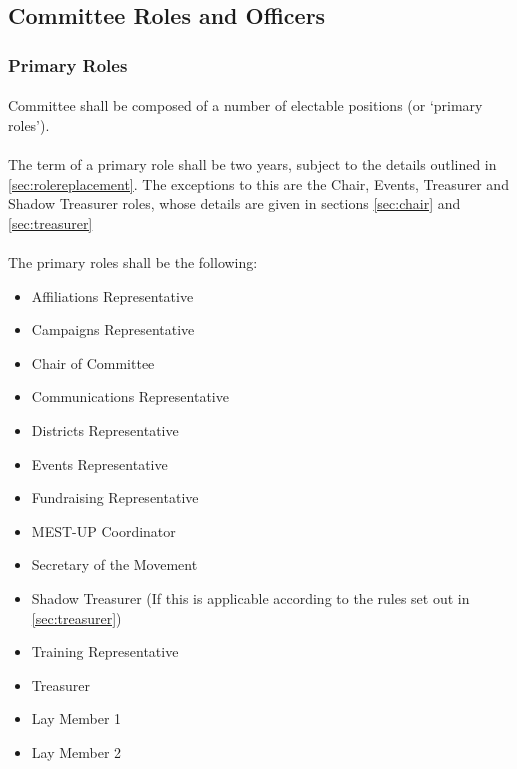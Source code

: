 \documentclass[a4paper, 11pt]{report}
\begin{document}
\subsection{Committee Roles and Officers}
\subsubsection{Primary Roles}
\label{sec:primaryroles}
\paragraph{} Committee shall be composed of a number of electable positions (or ‘primary roles’).

\paragraph{} The term of a primary role shall be two years, subject to the details outlined in \ref{sec:rolereplacement}.  The exceptions to this are the Chair, Events, Treasurer and Shadow Treasurer roles, whose details are given in sections \ref{sec:chair} and \ref{sec:treasurer}

\paragraph{} The primary roles shall be the following:

\begin{itemize}
\item Affiliations Representative
\item Campaigns Representative
\item Chair of Committee
\item Communications Representative
\item Districts Representative
\item Events Representative
\item Fundraising Representative
\item MEST-UP Coordinator
\item Secretary of the Movement
\item Shadow Treasurer (If this is applicable according to the rules set out in \autoref{sec:treasurer})
\item Training Representative
\item Treasurer
\item Lay Member 1
\item Lay Member 2
\end{itemize}
\end{document}
